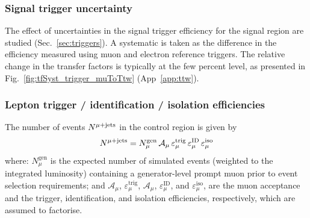 \subsubsection{Signal trigger uncertainty}
\label{sec:tfSyst_trigger}

The effect of uncertainties in the signal trigger efficiency for the
signal region are studied (Sec.~\ref{sec:triggers}). A systematic is
taken as the difference in the efficiency measured using muon and
electron reference triggers.  The relative change in the transfer
factors is typically at the few percent level, as presented in
Fig.~\ref{fig:tfSyst_trigger_muToTtw} (App~\ref{app:ttw}).

\subsubsection{Lepton trigger / identification / isolation efficiencies}
\label{sec:leptonSyst}

The number of events $N^{\mu + \textrm{jets}}$ in the \mj control region is given by
\begin{equation}
  \label{eq:lepton_eff_mj}
  N^{\mu + \textrm{jets}} = 
  N^\textrm{gen}_\mu \,
  \mathcal{A}_\mu \,
  \varepsilon^\textrm{trig}_\mu \,
  \varepsilon^\textrm{ID}_\mu \,
  \varepsilon^\textrm{iso}_\mu  
\end{equation}
where: $N^\textrm{gen}_\mu$ is the expected number of simulated events
(weighted to the integrated luminosity) containing a generator-level
prompt muon prior to event selection requirements; and
$\mathcal{A}_\mu$, $\varepsilon^\textrm{trig}_\mu$,
$\mathcal{A}_\mu$, $\varepsilon^\textrm{ID}_\mu$, and
$\varepsilon^\textrm{iso}_\mu$, are the muon acceptance and the
trigger, identification, and isolation efficiencies, respectively,
which are assumed to factorise. 


